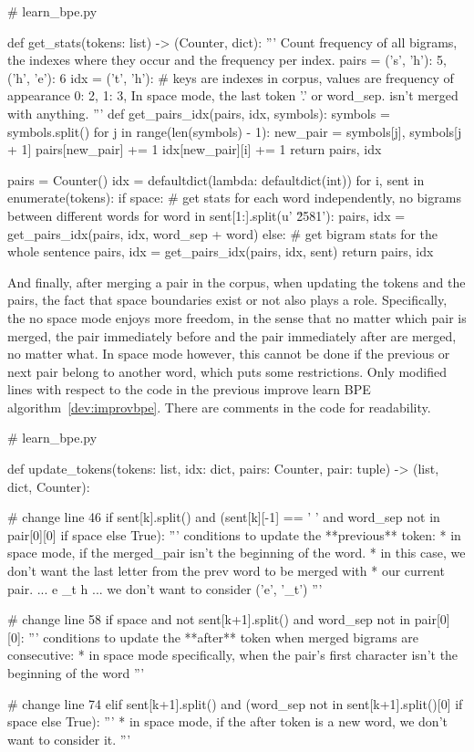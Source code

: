 \begin{python}
# learn_bpe.py

def get_stats(tokens: list) -> (Counter, dict):
  '''
  Count frequency of all bigrams, the indexes where they occur and the frequency per index.
  pairs = {
    ('s', 'h'): 5,
    ('h', 'e'): 6
  }
  idx = {
    ('t', 'h'): {
        # keys are indexes in corpus, values are frequency of appearance
        0: 2,
        1: 3,
    }
  }
  In space mode, the last token '.' or word_sep. isn't merged with anything.
  '''
  def get_pairs_idx(pairs, idx, symbols):
    symbols = symbols.split()
    for j in range(len(symbols) - 1):
      new_pair = symbols[j], symbols[j + 1]
      pairs[new_pair] += 1
      idx[new_pair][i] += 1
    return pairs, idx

  pairs = Counter()
  idx = defaultdict(lambda: defaultdict(int))
  for i, sent in enumerate(tokens):
    if space:
      # get stats for each word independently, no bigrams between different words
      for word in sent[1:].split(u' \u2581'):
      pairs, idx = get_pairs_idx(pairs, idx, word_sep + word)
    else:
      # get bigram stats for the whole sentence
      pairs, idx = get_pairs_idx(pairs, idx, sent)
  return pairs, idx
\end{python}

And finally, after merging a pair in the corpus, when updating the tokens and the pairs, the fact that space boundaries exist or not also plays a role. Specifically, the no space mode enjoys more freedom, in the sense that no matter which pair is merged, the pair immediately before and the pair immediately after are merged, no matter what. In space mode however, this cannot be done if the previous or next pair belong to another word, which puts some restrictions. Only modified lines with respect to the code in the previous improve learn BPE algorithm~\ref{dev:improvbpe}. There are comments in the code for readability.

\begin{python}
# learn_bpe.py

def update_tokens(tokens: list, idx: dict, pairs: Counter, pair: tuple) -> (list, dict, Counter):

# change line 46
if sent[k].split() and (sent[k][-1] == ' ' and word_sep not in pair[0][0] if space else True):
  '''
  conditions to update the **previous** token:
  * in space mode, if the merged_pair isn't the beginning of the word.
    * in this case, we don't want the last letter from the prev word to be merged with
    * our current pair. ... e _t h ... we don't want to consider ('e', '_t')
  '''

# change line 58
if space and not sent[k+1].split() and word_sep not in pair[0][0]:
  '''
  conditions to update the **after** token when merged bigrams are consecutive:
  * in space mode specifically, when the pair's first character isn't the beginning of the word
  '''

# change line 74
elif sent[k+1].split() and (word_sep not in sent[k+1].split()[0] if space else True):
  '''
  * in space mode, if the after token is a new word, we don't want to consider it.
  '''
\end{python}

